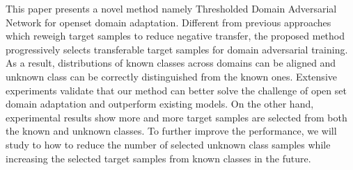 This paper presents a novel method namely Thresholded Domain Adversarial Network for openset domain adaptation.
Different from previous approaches which reweigh target samples to reduce negative transfer, the proposed method progressively selects transferable target samples for domain adversarial training. 
As a result, distributions of known classes across domains can be aligned and unknown class can be correctly distinguished from the known ones.
Extensive experiments validate that our method can better solve the challenge of open set domain adaptation and outperform existing models.
On the other hand, experimental results show more and more target samples are selected from both the known and unknown classes.
To further improve the performance, we will study to how to reduce the number of selected unknown class samples while increasing the selected target samples from known classes in the future.
